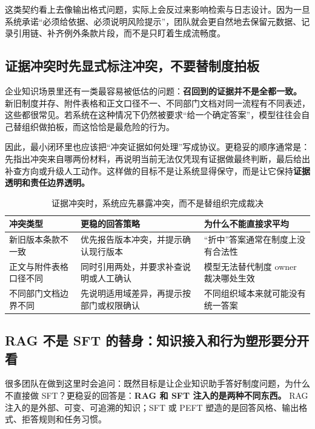这类契约看上去像输出格式问题，实际上会反过来影响检索与日志设计。因为一旦系统承诺“必须给依据、必须说明风险提示”，团队就会更自然地去保留元数据、记录引用链、补齐例外条款片段，而不是只盯着生成流畅度。

\subsection{证据冲突时先显式标注冲突，不要替制度拍板}
企业知识场景里还有一类最容易被低估的问题：\textbf{召回到的证据并不是全都一致。} 新旧制度并存、附件表格和正文口径不一、不同部门文档对同一流程有不同表述，这些都很常见。若系统在这种情况下仍然被要求“给一个确定答案”，模型往往会自己替组织做拍板，而这恰恰是最危险的行为。

因此，最小闭环里也应该把“冲突证据如何处理”写成协议。更稳妥的顺序通常是：先指出冲突来自哪两份材料，再说明当前无法仅凭现有证据做最终判断，最后给出补查方向或升级人工动作。这样做的目标不是让系统显得保守，而是让它保持\textbf{证据透明和责任边界透明。}

\begin{table}[H]
\centering
\small
\begin{tabularx}{\textwidth}{>{\raggedright\arraybackslash}p{2.8cm}>{\raggedright\arraybackslash}p{3cm}>{\raggedright\arraybackslash}X}
\toprule
\textbf{冲突类型} & \textbf{更稳的回答策略} & \textbf{为什么不能直接求平均} \\
\midrule
新旧版本条款不一致 & 优先报告版本冲突，并提示确认现行版本 & “折中”答案通常在制度上没有合法性 \\
正文与附件表格口径不同 & 同时引用两处，并要求补查说明或人工确认 & 模型无法替代制度 owner 裁决哪处生效 \\
不同部门文档边界不同 & 先说明适用域差异，再提示按部门或权限确认 & 不同组织域本来就可能没有统一答案 \\
\bottomrule
\end{tabularx}
\caption{证据冲突时，系统应先暴露冲突，而不是替组织完成裁决}
\label{tab:rag-conflict-handling}
\end{table}

\subsection{RAG 不是 SFT 的替身：知识接入和行为塑形要分开看}
很多团队在做到这里时会追问：既然目标是让企业知识助手答好制度问题，为什么不直接做 SFT？更稳妥的回答是：\textbf{RAG 和 SFT 注入的是两种不同东西。} RAG 注入的是外部、可变、可追溯的知识；SFT 或 PEFT 塑造的是回答风格、输出格式、拒答规则和任务习惯。

